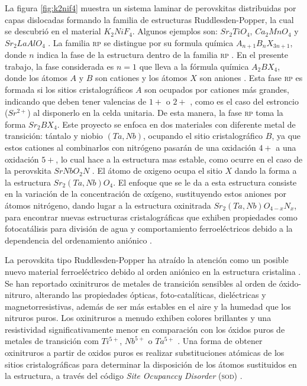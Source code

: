 La figura \ref{fig:k2nif4} muestra un sistema laminar de perovskitas distribuidas por capas dislocadas formando la familia de estructuras Ruddlesden-Popper, la cual se descubrió en el material $K_{2}NiF_{4}$. Algunos ejemplos son: $Sr_{2}TiO_{4}$, $Ca_{2}MnO_{4}$ y $Sr_{2}LaAlO_{4}$ \cite{NRuddl1957NewType}. La familia \textsc{rp} se distingue por su formula química $A_{n+1}B_{n}X_{3n+1}$, donde $n$ indica la fase de la estructura dentro de la familia \textsc{rp} \cite{Fuertes2012ChemistryPerovskites}. En el presente trabajo, la fase considerada es $n=1$ que lleva a la fórmula química $A_{2}BX_{4}$, donde los átomos $A$ y $B$ son cationes y los átomos $X$ son aniones \cite{Clarke2002}. Esta fase \textsc{rp} es formada si los sitios cristalográficos $A$ son ocupados por cationes más grandes, indicando que deben tener valencias de $1+$ o $2+$ \cite{Beznosikov2000}, como es el caso del estroncio ($Sr^{2+}$) al disponerlo en la celda unitaria. De esta manera, la fase \textsc{rp} toma la forma $Sr_{2}BX_{4}$. Este proyecto se enfoca en dos materiales con diferente metal de transición: tántalo y niobio $(Ta,Nb)$, ocupando el sitio cristalográfico $B$, ya que estos cationes al combinarlos con nitrógeno pasarán de una oxidación $4+$ a una oxidación $5+$, lo cual hace a la estructura mas estable, como ocurre en el caso de la perovskita $SrNbO_{2}N$ \cite{Tobias2004}. El átomo de oxigeno ocupa el sitio $X$ dando la forma a la estructura $Sr_{2}(Ta,Nb)O_{4}$. El enfoque que se le da a esta estructura consiste en la variación de la concentración de oxígeno, sustituyendo estos aniones por átomos nitrógeno, dando lugar a la estructura oxinitrada $Sr_{2}(Ta,Nb)O_{4-x}N_{x}$, para encontrar nuevas estructuras cristalográficas que exhiben propiedades como fotocatálisis para división de agua y comportamiento  ferroeléctricos debido a la dependencia del ordenamiento aniónico
\cite{Bouri2018,Morgan1986,Page2007LocalTheory}.

La perovskita tipo Ruddlesden-Popper ha atraído la atención como un posible nuevo material ferroeléctrico debido al orden aniónico en la estructura cristalina \cite{Gou2020Photocatalysis}. Se han reportado oxinitruros de metales de transición sensibles al orden de óxido-nitruro, alterando las propiedades ópticas, foto-catalíticas, dieléctricas y magnetorresistivas, además de ser más estables en el aire y la humedad que los nitruros puros\cite{Yang2011}. Los oxinitruros a menudo exhiben colores brillantes y una resistividad significativamente menor en comparación con los óxidos puros de metales de transición com $Ti^{5+}$, $Nb^{5+}$ o $Ta^{5+}$ \cite{Ebbinghaus2004}. Una forma de obtener oxinitruros a partir de oxidos puros es realizar substituciones atómicas de los sitios cristalográficas para determinar la disposición de los átomos sustituidos en la estructura, a través del código \textit{Site Ocupanccy Disorder} (\textsc{sod}) \cite{Grau-Crespo2007}.

